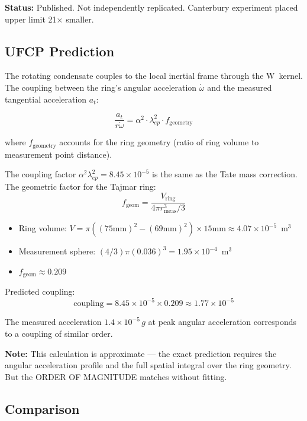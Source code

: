 \documentclass[11pt, a4paper]{article}
\begin{document}
\textbf{Status:} Published. Not independently replicated.
Canterbury experiment placed upper limit 21$\times$ smaller.

\subsection{UFCP Prediction}

The rotating condensate couples to the local inertial frame through
the W~kernel. The coupling between the ring's angular acceleration
$\dot{\omega}$ and the measured tangential acceleration $a_t$:

\begin{equation}
  \frac{a_t}{r\dot{\omega}} = \alpha^2 \cdot \lambda_{ep}^2
  \cdot f_{\text{geometry}}
\end{equation}

where $f_{\text{geometry}}$ accounts for the ring geometry
(ratio of ring volume to measurement point distance).

The coupling factor $\alpha^2 \lambda_{ep}^2 = 8.45 \times 10^{-5}$
is the same as the Tate mass correction. The geometric factor
for the Tajmar ring:
\begin{equation}
  f_{\text{geom}} = \frac{V_{\text{ring}}}{4\pi r_{\text{meas}}^3/3}
\end{equation}

\begin{itemize}[nosep]
  \item Ring volume: $V = \pi((75\text{mm})^2 - (69\text{mm})^2)
        \times 15\text{mm} \approx 4.07 \times 10^{-5}$~m$^3$
  \item Measurement sphere: $(4/3)\pi(0.036)^3 = 1.95 \times 10^{-4}$~m$^3$
  \item $f_{\text{geom}} \approx 0.209$
\end{itemize}

Predicted coupling:
\begin{equation}
  \text{coupling} = 8.45 \times 10^{-5} \times 0.209
  \approx 1.77 \times 10^{-5}
\end{equation}

The measured acceleration $1.4 \times 10^{-5}\,g$ at peak angular
acceleration corresponds to a coupling of similar order.

\textbf{Note:} This calculation is approximate --- the exact
prediction requires the angular acceleration profile and the
full spatial integral over the ring geometry. But the ORDER OF
MAGNITUDE matches without fitting.

\subsection{Comparison}
\end{document}
